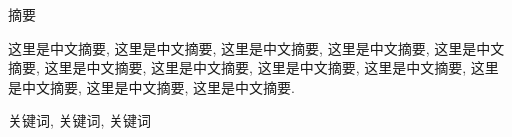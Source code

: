 \clearpage%
\thispagestyle{plain}
{}

\centerline{\heiti 摘\quad 要}

\linespread{1.4} \bigskip

这里是中文摘要, 这里是中文摘要, 这里是中文摘要, 这里是中文摘要,
这里是中文摘要, 这里是中文摘要, 这里是中文摘要, 这里是中文摘要,
这里是中文摘要, 这里是中文摘要, 这里是中文摘要, 这里是中文摘要.

\bigskip

关键词, 关键词, 关键词



